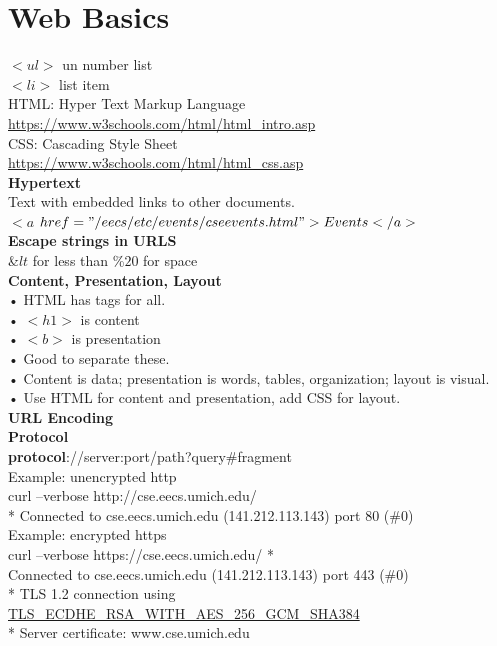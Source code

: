 \documentclass{article}
\begin{document}
\section{Web Basics}
$<ul>$ un number list\\
$<li>$ list item \\
HTML: Hyper Text Markup Language\\
\url{https://www.w3schools.com/html/html_intro.asp }\\
CSS: Cascading Style Sheet\\
\url{https://www.w3schools.com/html/html_css.asp}\\
\large{\textbf{Hypertext}}\\
Text with embedded links to other documents.\\
$<a $ $href="/eecs/etc/events/cseevents.html">\\
Events\\
</a>$\\
\large{\textbf{Escape strings in URLS}}\\
\&$lt$ for less than \%$20$ for space\\
\large{\textbf{Content, Presentation, Layout}}\\
• HTML has tags for all.\\
• $<h1>$ is content\\
• $<b>$ is presentation \\
• Good to separate these.\\
• Content is data; presentation is words, tables, organization; layout is
visual.\\
• Use HTML for content and presentation, add CSS for layout.\\
\large{\textbf{URL Encoding}}\\
\textbf{Protocol}\\
\textbf{protocol}://server:port/path?query#fragment\\
Example: unencrypted http\\
curl --verbose http://cse.eecs.umich.edu/ \\
* Connected to cse.eecs.umich.edu (141.212.113.143) port 80 (\#0)\\
Example: encrypted https\\
curl --verbose https://cse.eecs.umich.edu/ * \\ Connected to cse.eecs.umich.edu (141.212.113.143) port 443 (\#0)\\
* TLS 1.2 connection using \url{TLS_ECDHE_RSA_WITH_AES_256_GCM_SHA384} \\
* Server certificate: www.cse.umich.edu \\
\end{document}
